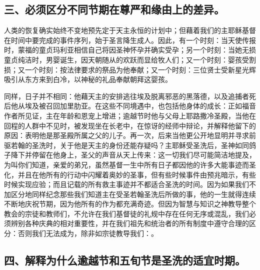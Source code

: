 
\subsection{三、必须区分不同节期在尊严和缘由上的差异。}

人类的恢复确实始终不变地预先定于天主永恒的计划中；但藉着我们的主耶稣基督在时间中要完成的事件序列，始于圣言降生成人。因此，有一个时刻：当天使传报时，蒙福的童贞玛利亚相信自己将因圣神怀孕并确实受孕；另一个时刻：当她无损童贞纯洁时，男婴诞生，因天朝随从的欢跃而显给牧人们；又一个时刻：婴孩受割损；又一个时刻：按法律要求的祭品为他奉献；又一个时刻：三位贤士受新星光辉吸引从东方来到白冷，以神秘的礼品奉献朝拜这婴孩。\par

同样，日子并不相同：他藉天主的安排逃往埃及脱离邪恶的黑落德，以及追捕者死后他从埃及被召回加里肋亚。在这些不同境遇中，也包括他身体的成长：正如福音作者所见证，主在年龄和恩宠上增进；逾越节时他与父母上耶路撒冷圣殿，当他在回程的人群中不见时，被发现坐在长老中，在惊讶的经师中辩论，并解释他留下的原因：表明他是那圣殿所属之父的儿子。再一次，后来当他更公开地显明并寻求前驱若翰的圣洗时，关于他是天主的身份还能存疑吗？主耶稣受圣洗后，圣神如同鸽子降下并停留在他身上，圣父的声音从天上传来：这一切我们尽可能简洁地提及，为叫你们知道，亲爱的弟兄，虽然基督一生中所有日子都因他的许多大能事迹而圣化，并且在他所有的行动中闪耀着奥妙的圣事，但有些时候事件由预兆暗示，有些时候实现应验；而且记载的所有救主事迹并不都适合圣洗的时间。因为如果我们不加区分地同样纪念那些我们知道主在受圣若翰圣洗后所做的事，他的一生就得连续不断地庆祝节期，因为他所有的作为都充满奇迹。但因为智慧与知识之神教导整个教会的宗徒和教师们，不允许在我们基督徒的礼规中存在任何无序或混乱，我们必须辨别各种庆典的相对重要性，并在我们祖先和统治者的所有制度中遵守合理的区分：否则我们无法成为，除非如宗徒教导我们：。\par


\subsection{四、解释为什么逾越节和五旬节是圣洗的适宜时期。}

